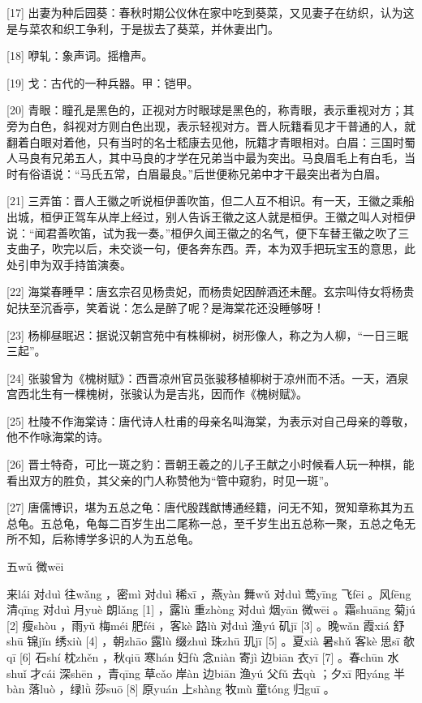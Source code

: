 \documentclass[12pt,UTF8]{ctexbook}
\begin{document}
[17] 出妻为种后园葵：春秋时期公仪休在家中吃到葵菜，又见妻子在纺织，认为这是与菜农和织工争利，于是拔去了葵菜，并休妻出门。

[18] 咿轧：象声词。摇橹声。

[19] 戈：古代的一种兵器。甲：铠甲。

[20] 青眼：瞳孔是黑色的，正视对方时眼球是黑色的，称青眼，表示重视对方；其旁为白色，斜视对方则白色出现，表示轻视对方。晋人阮籍看见才干普通的人，就翻着白眼对着他，只有当时的名士嵇康去见他，阮籍才青眼相对。白眉：三国时蜀人马良有兄弟五人，其中马良的才学在兄弟当中最为突出。马良眉毛上有白毛，当时有俗语说：“马氏五常，白眉最良。”后世便称兄弟中才干最突出者为白眉。

[21] 三弄笛：晋人王徽之听说桓伊善吹笛，但二人互不相识。有一天，王徽之乘船出城，桓伊正驾车从岸上经过，别人告诉王徽之这人就是桓伊。王徽之叫人对桓伊说：“闻君善吹笛，试为我一奏。”桓伊久闻王徽之的名气，便下车替王徽之吹了三支曲子，吹完以后，未交谈一句，便各奔东西。弄，本为双手把玩宝玉的意思，此处引申为双手持笛演奏。

[22] 海棠春睡早：唐玄宗召见杨贵妃，而杨贵妃因醉酒还未醒。玄宗叫侍女将杨贵妃扶至沉香亭，笑着说：怎么是醉了呢？是海棠花还没睡够呀！

[23] 杨柳昼眠迟：据说汉朝宫苑中有株柳树，树形像人，称之为人柳，“一日三眠三起”。

[24] 张骏曾为《槐树赋》：西晋凉州官员张骏移植柳树于凉州而不活。一天，酒泉宫西北生有一棵槐树，张骏认为是吉兆，因而作《槐树赋》。

[25] 杜陵不作海棠诗：唐代诗人杜甫的母亲名叫海棠，为表示对自己母亲的尊敬，他不作咏海棠的诗。

[26] 晋士特奇，可比一斑之豹：晋朝王羲之的儿子王献之小时候看人玩一种棋，能看出双方的胜负，其父亲的门人称赞他为“管中窥豹，时见一斑”。

[27] 唐儒博识，堪为五总之龟：唐代殷践猷博通经籍，问无不知，贺知章称其为五总龟。五总龟，龟每二百岁生出二尾称一总，至千岁生出五总称一聚，五总之龟无所不知，后称博学多识的人为五总龟。





五wǔ 微wēi


来lái 对duì 往wǎng ，密mì 对duì 稀xī ，燕yàn 舞wǔ 对duì 莺yīng 飞fēi 。风fēng 清qīng 对duì 月yuè 朗lǎng [1] ，露lù 重zhòng 对duì 烟yān 微wēi 。霜shuāng 菊jú [2] 瘦shòu ，雨yǔ 梅méi 肥féi ，客kè 路lù 对duì 渔yú 矶jī [3] 。晚wǎn 霞xiá 舒shū 锦jǐn 绣xiù [4] ，朝zhāo 露lù 缀zhuì 珠zhū 玑jī [5] 。夏xià 暑shǔ 客kè 思sī 欹qī [6] 石shí 枕zhěn ，秋qiū 寒hán 妇fù 念niàn 寄jì 边biān 衣yī [7] 。春chūn 水shuǐ 才cái 深shēn ，青qīng 草cǎo 岸àn 边biān 渔yú 父fǔ 去qù ；夕xī 阳yáng 半bàn 落luò ，绿lǜ 莎suō [8] 原yuán 上shàng 牧mù 童tóng 归guī 。
\end{document}

